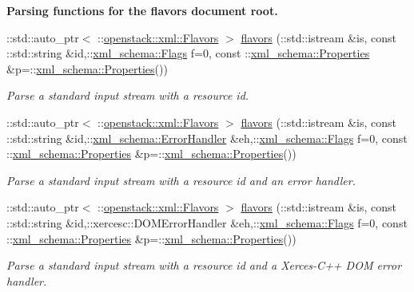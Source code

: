 \begin{Indent}{\bf Parsing functions for the flavors document root.}
\begin{DoxyCompactItemize}
::std::auto\_\-ptr$<$ ::\hyperlink{classopenstack_1_1xml_1_1Flavors}{openstack::xml::Flavors} $>$ \hyperlink{namespaceopenstack_1_1xml_a747ad760ba27a1813e95d29f49110a9b}{flavors} (::std::istream \&is, const ::std::string \&id,::\hyperlink{namespacexml__schema_affb4c227cbd9aa7453dd1dc5a1401943}{xml\_\-schema::Flags} f=0, const ::\hyperlink{namespacexml__schema_ad27ce19a7ee1d3b1064092648898f64c}{xml\_\-schema::Properties} \&p=::\hyperlink{namespacexml__schema_ad27ce19a7ee1d3b1064092648898f64c}{xml\_\-schema::Properties}())
\begin{DoxyCompactList}\small\item\em Parse a standard input stream with a resource id. \item\end{DoxyCompactList}\item 
::std::auto\_\-ptr$<$ ::\hyperlink{classopenstack_1_1xml_1_1Flavors}{openstack::xml::Flavors} $>$ \hyperlink{namespaceopenstack_1_1xml_a295293e5037a5343c36cbf7f7faa2dbe}{flavors} (::std::istream \&is, const ::std::string \&id,::\hyperlink{namespacexml__schema_ab1c9361bfd3b404eaabf0c31eded79dc}{xml\_\-schema::ErrorHandler} \&eh,::\hyperlink{namespacexml__schema_affb4c227cbd9aa7453dd1dc5a1401943}{xml\_\-schema::Flags} f=0, const ::\hyperlink{namespacexml__schema_ad27ce19a7ee1d3b1064092648898f64c}{xml\_\-schema::Properties} \&p=::\hyperlink{namespacexml__schema_ad27ce19a7ee1d3b1064092648898f64c}{xml\_\-schema::Properties}())
\begin{DoxyCompactList}\small\item\em Parse a standard input stream with a resource id and an error handler. \item\end{DoxyCompactList}\item 
::std::auto\_\-ptr$<$ ::\hyperlink{classopenstack_1_1xml_1_1Flavors}{openstack::xml::Flavors} $>$ \hyperlink{namespaceopenstack_1_1xml_afc960a8fd9f18f9498b08727ad06b94f}{flavors} (::std::istream \&is, const ::std::string \&id,::xercesc::DOMErrorHandler \&eh,::\hyperlink{namespacexml__schema_affb4c227cbd9aa7453dd1dc5a1401943}{xml\_\-schema::Flags} f=0, const ::\hyperlink{namespacexml__schema_ad27ce19a7ee1d3b1064092648898f64c}{xml\_\-schema::Properties} \&p=::\hyperlink{namespacexml__schema_ad27ce19a7ee1d3b1064092648898f64c}{xml\_\-schema::Properties}())
\begin{DoxyCompactList}\small\item\em Parse a standard input stream with a resource id and a Xerces-\/C++ DOM error handler. \item\end{DoxyCompactList}\item 

\end{DoxyCompactItemize}
\end{Indent}
